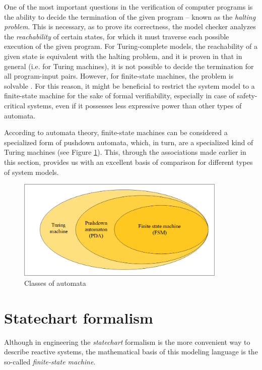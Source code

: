 One of the most important questions in the verification of computer programs is the ability to decide the termination of the given program -- known as the \textit{halting problem}. This is necessary, as to prove its correctness, the model checker analyzes the \textit{reachability} of certain states, for which it must traverse each possible execution of the given program. For Turing-complete models, the reachability of a given state is equivalent with the halting problem, and it is proven in \cite{Turing1936} that in general (i.e. for Turing machines), it is not possible to decide the termination for all program-input pairs. However, for finite-state machines, the problem is solvable \cite{Minsky:1967}. For this reason, it might be beneficial to restrict the system model to a finite-state machine for the sake of formal verifiability, especially in case of safety-critical systems, even if it possesses less expressive power than other types of automata. 

According to automata theory, finite-state machines can be considered a specialized form of pushdown automata, which, in turn, are a specialized kind of Turing machines (see Figure \ref{fig:automataTheory}). This, through the associations made earlier in this section, provides us with an excellent basis of comparison for different types of system models.

\begin{figure}[!ht]
	\centering
	\includegraphics[width=100mm, keepaspectratio]{figures/automataTheory.png}
	\caption{Classes of automata}
	\label{fig:automataTheory}
\end{figure}

\section{Statechart formalism} \label{section_background_statechart}
Although in engineering the \textit{statechart} formalism is the more convenient way to describe reactive systems, the mathematical basis of this modeling language is the so-called \textit{finite-state machine}.

